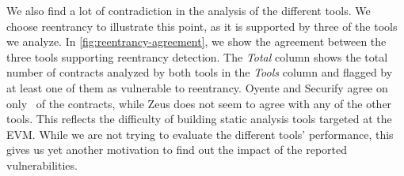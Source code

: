 We also find a lot of contradiction in the analysis of the different tools.
We choose reentrancy to illustrate this point, as it is supported by three of the tools we analyze. In \autoref{fig:reentrancy-agreement}, we show the agreement between the three tools supporting reentrancy detection. The \emph{Total} column shows the total number of contracts analyzed by both tools in the \emph{Tools} column and flagged by at least one of them as vulnerable to reentrancy. Oyente and Securify agree on only~ of the contracts, while Zeus does not seem to agree with any of the other tools.
This reflects the difficulty of building static analysis tools targeted at the EVM. While we are not trying to evaluate the different tools' performance, this gives us yet another motivation to find out the impact of the reported vulnerabilities.
